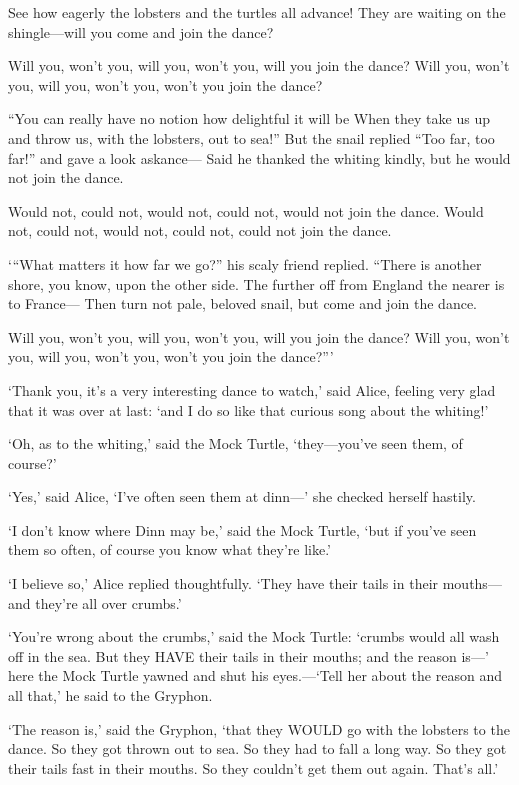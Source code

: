\documentclass[12pt]{book}
\begin{document}
\begin{Parallel}[p]{}{}
{ See how eagerly the lobsters and the turtles all advance!
 They are waiting on the shingle—will you come and join the dance?

 Will you, won’t you, will you, won’t you, will you join the dance?
 Will you, won’t you, will you, won’t you, won’t you join the dance?

 “You can really have no notion how delightful it will be
 When they take us up and throw us, with the lobsters, out to sea!”
 But the snail replied “Too far, too far!” and gave a look askance—
 Said he thanked the whiting kindly, but he would not join the dance.

 Would not, could not, would not, could not, would not join the dance.
 Would not, could not, would not, could not, could not join the dance.

 ‘“What matters it how far we go?” his scaly friend replied.
 “There is another shore, you know, upon the other side.
 The further off from England the nearer is to France—
 Then turn not pale, beloved snail, but come and join the dance.

 Will you, won’t you, will you, won’t you, will you join the dance?
 Will you, won’t you, will you, won’t you, won’t you join the dance?”’

‘Thank you, it’s a very interesting dance to watch,’ said Alice, feeling very glad that it was over at last: ‘and I do so like that curious song about the whiting!’

‘Oh, as to the whiting,’ said the Mock Turtle, ‘they—you’ve seen them, of course?’

‘Yes,’ said Alice, ‘I’ve often seen them at dinn—’ she checked herself hastily.

‘I don’t know where Dinn may be,’ said the Mock Turtle, ‘but if you’ve seen them so often, of course you know what they’re like.’

‘I believe so,’ Alice replied thoughtfully. ‘They have their tails in their mouths—and they’re all over crumbs.’

‘You’re wrong about the crumbs,’ said the Mock Turtle: ‘crumbs would all wash off in the sea. But they HAVE their tails in their mouths; and the reason is—’ here the Mock Turtle yawned and shut his eyes.—‘Tell her about the reason and all that,’ he said to the Gryphon.

‘The reason is,’ said the Gryphon, ‘that they WOULD go with the lobsters to the dance. So they got thrown out to sea. So they had to fall a long way. So they got their tails fast in their mouths. So they couldn’t get them out again. That’s all.’

}
\end{Parallel}
\end{document}

